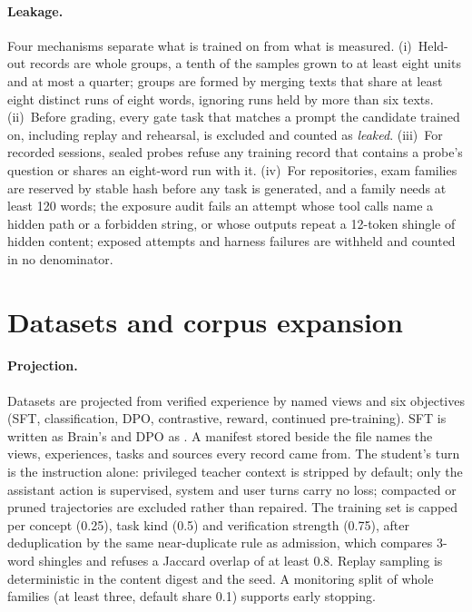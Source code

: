 \paragraph{Leakage.} Four mechanisms separate what is trained on from what is measured.
(i)~Held-out records are whole groups, a tenth of the samples grown to at least eight
units and at most a quarter; groups are formed by merging texts that share at
least eight distinct runs of eight words, ignoring runs held by more than six
texts. (ii)~Before grading, every gate task that matches a prompt the candidate
trained on, including replay and rehearsal, is excluded and counted as
\emph{leaked}. (iii)~For recorded sessions, sealed probes refuse any training
record that contains a probe's question or shares an eight-word run with it.
(iv)~For repositories, exam families are reserved by stable hash before any task is
generated, and a family needs at least 120 words; the exposure audit fails an
attempt whose tool calls name a hidden path or a forbidden string, or whose outputs
repeat a 12-token shingle of hidden content; exposed attempts and harness
failures are withheld and counted in no denominator.

\section{Datasets and corpus expansion}\label{sec:dataset}

\paragraph{Projection.} Datasets are projected from verified experience by named views
and six objectives (SFT, classification, DPO, contrastive, reward, continued
pre-training). SFT is written as Brain's  and DPO as
. A manifest stored beside the file names the views,
experiences, tasks and sources every record came from. The student's turn is the
instruction alone: privileged teacher context is stripped by default; only the
assistant action is supervised, system and user turns carry no loss; compacted or
pruned trajectories are excluded rather than repaired. The training set is capped
per concept (0.25), task kind (0.5) and verification strength (0.75), after
deduplication by the same near-duplicate rule as admission, which compares 3-word shingles and refuses a Jaccard overlap of at least 0.8. Replay sampling is deterministic in the content digest and the seed. A monitoring
split of whole families (at least three, default share 0.1) supports early
stopping.

